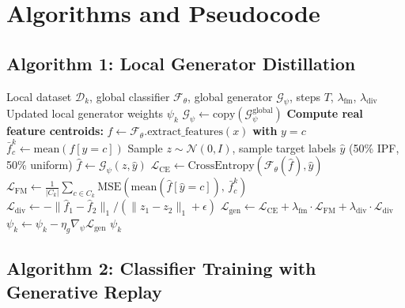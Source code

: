 \documentclass[12pt,a4paper]{report}
\begin{document}
\section{Algorithms and Pseudocode}

\subsection{Algorithm 1: Local Generator Distillation}

\begin{algorithm}[H]
\caption{Local Generator Training with Feature Matching (Hospital $k$)}
\label{alg:gen_train}
\begin{algorithmic}[1]
\Require Local dataset $\mathcal{D}_k$, global classifier $\mathcal{F}_\theta$, global generator $\mathcal{G}_\psi$, steps $T$, $\lambda_{\text{fm}}$, $\lambda_{\text{div}}$
\Ensure Updated local generator weights $\psi_k$
\State $\mathcal{G}_\psi \leftarrow \text{copy}(\mathcal{G}_\psi^{\text{global}})$
\State \textbf{Compute real feature centroids:}
    \State $f \leftarrow \mathcal{F}_\theta.\text{extract\_features}(x)$
     \textbf{with} $y = c$
        \State $\bar{f}_c^k \leftarrow \text{mean}(f[y = c])$
    \EndFor
\EndFor
{}
    \State Sample $z \sim \mathcal{N}(0, I)$, sample target labels $\hat{y}$ (50\% IPF, 50\% uniform)
    \State $\hat{f} \leftarrow \mathcal{G}_\psi(z, \hat{y})$
    \State $\mathcal{L}_{\text{CE}} \leftarrow \text{CrossEntropy}(\mathcal{F}_\theta(\hat{f}), \hat{y})$
    \State $\mathcal{L}_{\text{FM}} \leftarrow \frac{1}{|C_k|}\sum_{c \in C_k} \text{MSE}(\text{mean}(\hat{f}[\hat{y}=c]),\, \bar{f}_c^k)$
    \State $\mathcal{L}_{\text{div}} \leftarrow -\|\hat{f}_1 - \hat{f}_2\|_1 / (\|z_1 - z_2\|_1 + \epsilon)$
    \State $\mathcal{L}_{\text{gen}} \leftarrow \mathcal{L}_{\text{CE}} + \lambda_{\text{fm}} \cdot \mathcal{L}_{\text{FM}} + \lambda_{\text{div}} \cdot \mathcal{L}_{\text{div}}$
    \State $\psi_k \leftarrow \psi_k - \eta_g \nabla_\psi \mathcal{L}_{\text{gen}}$
\EndFor
\State \Return $\psi_k$
\end{algorithmic}
\end{algorithm}

\subsection{Algorithm 2: Classifier Training with Generative Replay}
\end{document}
